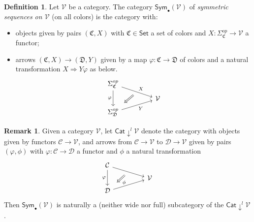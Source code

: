 \documentclass[a4paper,10pt
,draft
]{article}%
\numberwithin{equation}{section}
\numberwithin{figure}{section}
\theoremstyle{definition} %
\newtheorem{definition}[equation]{Definition}%
\newtheorem{remark}[equation]{Remark}%
\newcommand{\Cat}{\mathsf{Cat}}
\newcommand{\V}{\ensuremath{\mathcal V}}
\newcommand{\1}{\ensuremath{\mathbbm 1}}%
\begin{document}
\begin{definition}
Let $\mathcal{V}$ be a category.
The category $\mathsf{Sym}_\bullet(\mathcal{V})$ of
\textit{symmetric sequences on $\mathcal{V}$} 
(on all colors) is the category with:
\begin{itemize}
\item objects given by pairs $(\mathfrak C, X)$ with
      $\mathfrak{C} \in \mathsf{Set}$ a set of colors and
      $X \colon \Sigma_{\mathfrak{C}}^{op} \to \mathcal{V}$ a functor;
\item arrows $(\mathfrak C, X) \to (\mathfrak D, Y)$ given by a map 
      $\varphi \colon \mathfrak{C} \to \mathfrak{D}$ of colors and a natural transformation $X \Rightarrow Y \varphi$ as below.
\begin{equation}
\begin{tikzcd}[row sep = tiny, column sep = 45pt]
                  \Sigma_{\mathfrak{C}}^{op} \arrow[dr, "X"{name=U}] 
                  \arrow{dd}[swap]{\varphi}
\\
	& \mathcal{V}
\\
                  |[alias=V]| \Sigma_{\mathfrak{D}}^{op} \arrow[ur, "Y"']
                  \arrow[Leftarrow, from=V, to=U,shorten >=0.25cm,shorten <=0.25cm]
\end{tikzcd}
\end{equation}
\end{itemize}
\end{definition}


\begin{remark}\label{SUBCATDOWNL REM}
Given a category $\V$, let $\Cat \downarrow^l \V$ denote the category with
objects given by functors $\mathcal{C} \to \V$,
and arrows from $\mathcal{C} \to \V$ to $\mathcal{D} \to \V$
given by pairs 
$(\varphi,\phi)$ with 
$\varphi \colon \mathcal{C} \to \mathcal{D}$ a functor and
$\phi$ a natural transformation
\begin{equation}\label{SUBCATDOWNL EQ}
\begin{tikzcd}[row sep = tiny, column sep = 45pt]
	\mathcal C \arrow{dr}[name=U]{} \arrow{dd}[swap]{\varphi}
\\
	& \mathcal{V}
\\
	|[alias=V]| \mathcal D \arrow{ur}[swap]{}
	\arrow[Leftarrow, from=V, to=U,shorten >=0.25cm,shorten <=0.25cm
    ,swap,"\phi"]
\end{tikzcd}
\end{equation}
Then $\mathsf{Sym}_{\bullet}(\mathcal{V})$ is naturally a (neither wide nor full) subcategory of the $\mathsf{Cat}\downarrow^l \mathcal{V}$.
\end{remark}
\end{document}
